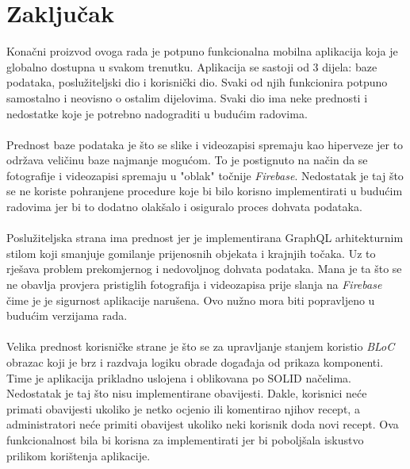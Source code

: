 \documentclass[times, utf8, zavrsni]{fer}
\begin{document}
\chapter{Zaključak}
Konačni proizvod ovoga rada je potpuno funkcionalna mobilna aplikacija koja je globalno dostupna u svakom trenutku.
Aplikacija se sastoji od 3 dijela: baze podataka, poslužiteljski dio i korisnički dio. Svaki od njih funkcionira potpuno
samostalno i neovisno o ostalim dijelovima. Svaki dio ima neke prednosti i nedostatke koje je potrebno
nadograditi u budućim radovima.
\\\\
Prednost baze podataka je što se slike i videozapisi spremaju kao hiperveze
jer to održava veličinu baze najmanje mogućom. To je postignuto na način da se fotografije i videozapisi
spremaju u "oblak" točnije \textit{Firebase}. Nedostatak
je taj što se ne koriste pohranjene procedure koje bi bilo korisno implementirati
u budućim radovima jer bi to dodatno olakšalo i osiguralo proces dohvata podataka.
\\\\
Poslužiteljska strana ima prednost jer je implementirana GraphQL
arhitekturnim stilom koji smanjuje gomilanje prijenosnih objekata i krajnjih točaka. Uz to rješava problem
prekomjernog i nedovoljnog dohvata podataka.
Mana je ta što se ne obavlja provjera pristiglih fotografija i videozapisa prije slanja na \textit{Firebase} čime je
je sigurnost aplikacije narušena. Ovo nužno mora biti popravljeno u budućim verzijama rada.
\\\\
Velika prednost korisničke strane je što se za upravljanje stanjem koristio
\textit{BLoC} obrazac koji je brz i razdvaja logiku obrade događaja od prikaza komponenti.
Time je aplikacija prikladno uslojena i oblikovana po SOLID načelima. Nedostatak je taj što nisu implementirane
obavijesti. Dakle, korisnici neće primati obavijesti ukoliko je netko ocjenio ili komentirao njihov recept, a administratori neće
primiti obavijest ukoliko neki korisnik doda novi recept. Ova funkcionalnost bila bi korisna za implementirati
jer bi poboljšala iskustvo prilikom korištenja aplikacije.



\nocite{ProgramiranjeUJavi}
\nocite{GraphQL}
\nocite{Authentication}
\nocite{Spring}
\nocite{bloc}
\end{document}
